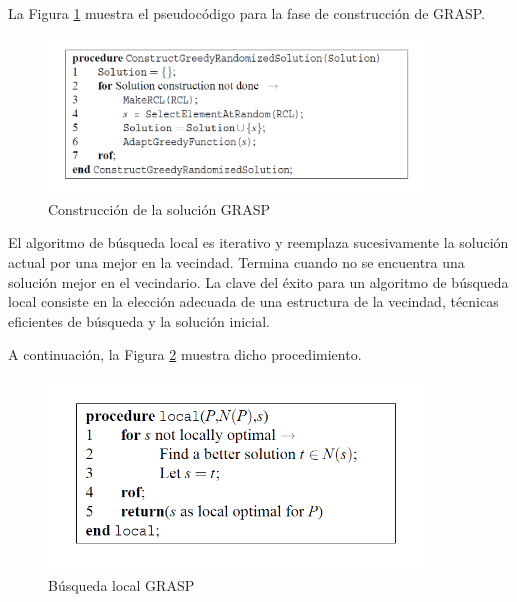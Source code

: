 \documentclass[a4paper,openright,11pt,oneside]{book}
\begin{document}
		La Figura \ref{GRASPconstructionphase} muestra el pseudocódigo para la fase de construcción de GRASP.
	
		\begin{figure}[h]
			\centering
			\includegraphics[width=10cm]{./Graphics/GRASPconstructionphase.png}
			\caption{Construcción de la solución GRASP \cite{binato2001greedy}}
			\label{GRASPconstructionphase}
		\end{figure}
	
		El algoritmo de búsqueda local es iterativo y reemplaza sucesivamente la solución actual por una mejor en la vecindad. Termina cuando no se encuentra una solución mejor en el vecindario. La clave del éxito para un algoritmo de búsqueda local consiste en la elección adecuada de una estructura de la vecindad, técnicas eficientes de búsqueda y la solución inicial.
		
		A continuación, la Figura \ref{GRASPlocal} muestra dicho procedimiento.
		
		\begin{figure}[h]
			\centering
			\includegraphics[width=10cm]{./Graphics/GRASPlocal.png}
			\caption{Búsqueda local GRASP \cite{binato2001greedy}}
			\label{GRASPlocal}
		\end{figure}
	
\end{document}
